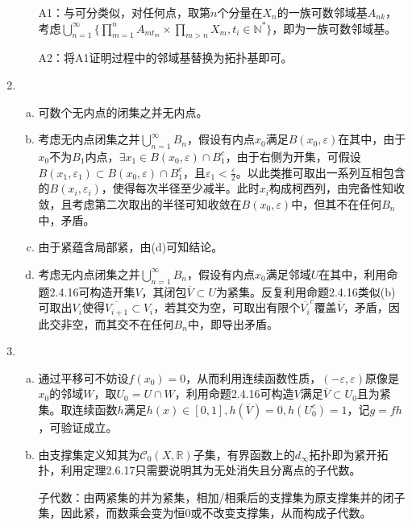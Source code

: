 \documentclass[a4paper,UTF8,fontset=windows]{ctexart}
\begin{document}
\begin{enumerate}[(1)]
\begin{enumerate}[(a)]
    A1：与可分类似，对任何点，取第$n$个分量在$X_n$的一族可数邻域基$A_{nk}$，考虑$\bigcup_{n=1}^\infty\big\{\prod_{m=1}^nA_{mt_m}\times\prod_{m>n}X_m,t_i\in\mathbb{N}^*\big\}$，即为一族可数邻域基。
    
    A2：将A1证明过程中的邻域基替换为拓扑基即可。
    \end{enumerate}
    
    \item
    \begin{enumerate}[(a)]
    \item
    可数个无内点的闭集之并无内点。
    
    \item
    考虑无内点闭集之并$\bigcup_{n=1}^\infty B_n$，假设有内点$x_0$满足$B(x_0,\varepsilon)$在其中，由于$x_0$不为$B_1$内点，$\exists x_1\in B(x_0,\varepsilon)\cap B_1^c$，由于右侧为开集，可假设$B(x_1,\varepsilon_1)\subset B(x_0,\varepsilon)\cap B_1^c$，且$\varepsilon_1<\frac{\varepsilon}{2}$。以此类推可取出一系列互相包含的$B(x_i,\varepsilon_i)$，使得每次半径至少减半。此时$x_i$构成柯西列，由完备性知收敛，且考虑第二次取出的半径可知收敛在$B(x_0,\varepsilon)$中，但其不在任何$B_n$中，矛盾。
    
    \item
    由于紧蕴含局部紧，由(d)可知结论。
    
    \item
    考虑无内点闭集之并$\bigcup_{n=1}^\infty B_n$，假设有内点$x_0$满足邻域$U$在其中，利用命题2.4.16可构造开集$V$，其闭包$\overline{V}\subset U$为紧集。反复利用命题2.4.16类似(b)可取出$V_i$使得$\overline{V_{i+1}}\subset V_i$，若其交为空，可取出有限个$\overline{V_i}^c$覆盖$\overline{V}$，矛盾，因此交非空，而其交不在任何$B_n$中，即导出矛盾。
    \end{enumerate}
    
    \item
    \begin{enumerate}[(a)]
    \item
    通过平移可不妨设$f(x_0)=0$，从而利用连续函数性质，$(-\varepsilon,\varepsilon)$原像是$x_0$的邻域$W$，取$U_0=U\cap W$，利用命题2.4.16可构造$V$满足$\overline{V}\subset U_0$且为紧集。取连续函数$h$满足$h(x)\in[0,1],h(\overline{V})=0,h(U_0^c)=1$，记$g=fh$，可验证成立。
    
    \item
    由支撑集定义知其为$\mathcal{C}_0(X,\mathbb{R})$子集，有界函数上的$d_\infty$拓扑即为紧开拓扑，利用定理2.6.17只需要说明其为无处消失且分离点的子代数。
    
    子代数：由两紧集的并为紧集，相加/相乘后的支撑集为原支撑集并的闭子集，因此紧，而数乘会变为恒0或不改变支撑集，从而构成子代数。
    

\end{enumerate}
\end{enumerate}
\end{document}
